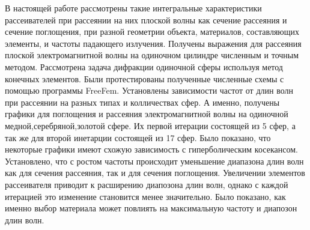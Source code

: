 \conclusion
В настоящей работе рассмотрены такие интегральные характеристики рассеивателей при рассеянии на них плоской волны как сечение рассеяния и сечение поглощения, при разной геометрии объекта, материалов, составляющих элементы, и частоты падающего излучения. Получены выражения для рассеяния плоской электромагнитной волны на одиночном цилиндре численным и точным методом. Рассмотрена задача дифракции одиночной сферы используя метод конечных элементов. Были протестированы полученные численные схемы с помощью программы FreeFem. Установлены зависимости частот от длин волн при рассеянии на разных типах и колличествах сфер. А именно, получены графики для поглощения и рассеяния электромагнитной волны на одиночной медной,серебряной,золотой сфере. Их первой итерации состоящей из 5 сфер, а так же для второй инетарции состоящей из 17 сфер. Было показано, что некоторые графики имеют схожую зависимость с гиперболическим косекансом. Установлено, что с ростом частоты происходит уменьшение диапазона длин волн как для сечения рассеяния, так и для сечения поглощения. Увеличении элементов рассеивателя приводит к расширению диапозона длин волн, однако с каждой итерацией это изменение становится менее значительно. Было показано, как именно выбор материала может повлиять на максимальную частоту и диапозон длин волн. 
